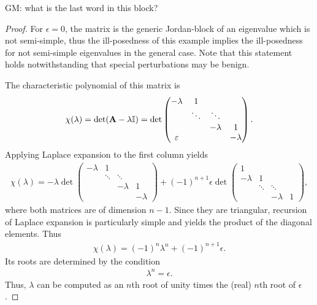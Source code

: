 \begin{todo}
  GM: what is the last word in this block?
\end{todo}
\begin{proof}
  For $\epsilon=0$, the matrix is the generic Jordan-block of an eigenvalue which is not semi-simple, thus the ill-posedness of this example implies the ill-posedness for not semi-simple eigenvalues in the general case. Note that this statement holds notwithstanding that special perturbations may be benign.

  The characteristic polynomial of this matrix is
  \begin{gather}
      \chi(\lambda) = \det(\mathbf A-\lambda\mathbb I)
      = \det\begin{pmatrix}
      -\lambda&1\\
        &\ddots&\ddots\\
        &&-\lambda&1\\
        \varepsilon &&&-\lambda
      \end{pmatrix}.
  \end{gather}
  Applying Laplace expansion to the first column yields
  \begin{gather}
      \chi(\lambda)
      = -\lambda \det\begin{pmatrix}
        -\lambda&1\\
        &\ddots&\ddots\\
        &&-\lambda&1\\
        &&&-\lambda
      \end{pmatrix}
      + (-1)^{n+1} \epsilon\det\begin{pmatrix}
        1 \\
        -\lambda &1\\
        &\ddots&\ddots\\
        &&-\lambda&1
      \end{pmatrix},
  \end{gather}
  where both matrices are of dimension $n-1$. Since they are triangular, recursion of Laplace expansion is particularly simple and yields the product of the diagonal elements. Thus
  \begin{gather}
      \chi(\lambda) = (-1)^n \lambda^n
      + (-1)^{n+1} \epsilon.
  \end{gather}
  Its roots are determined by the condition
  \begin{gather}
      \lambda^n = \epsilon.
  \end{gather}
  Thus, $\lambda$ can be computed as an $n$th root of unity times the (real) $n$th root of $\epsilon$.
\end{proof}

